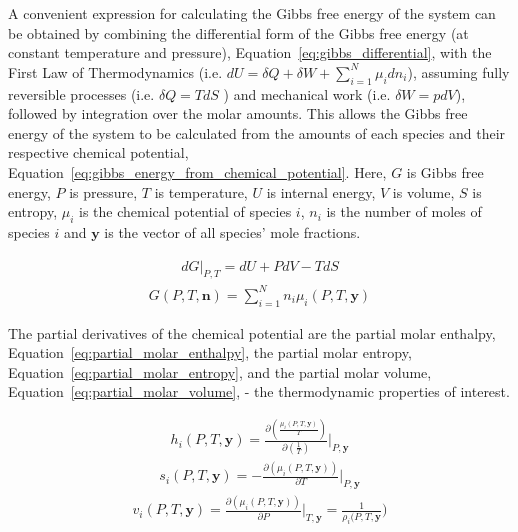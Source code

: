     A convenient expression for calculating the Gibbs free energy of the system can be obtained by combining the differential form of the Gibbs free energy (at constant temperature and pressure), Equation~\ref{eq:gibbs_differential}, with the First Law of Thermodynamics (i.e. \(dU= \delta Q + \delta W + \sum _{i=1}^N \mu_i dn_i\)), assuming fully reversible processes (i.e. \(\delta Q = TdS\) ) and mechanical work (i.e. \(\delta W = pdV\)), followed by integration over the molar amounts. This allows the Gibbs free energy of the system to be calculated from the amounts of each species and their respective chemical potential, Equation~\ref{eq:gibbs_energy_from_chemical_potential}. Here, \(G\) is Gibbs free energy, \(P\) is pressure, \(T\) is temperature, \(U\) is internal energy, \(V\) is volume, \(S\) is entropy, \(\mu_i\) is the chemical potential of species \(i\), \(n_i\) is the number of moles of species \(i\) and \(\mathbf{y}\) is the vector of all species’ mole fractions.

    \begin{align}
        dG \big|_{P,T} = dU + PdV - TdS \label{eq:gibbs_differential}
    \end{align}
    \begin{align}
        G(P, T, \mathbf{n}) = \sum _{i=1}^N n_i \mu_i(P, T, \mathbf{y}) \label{eq:gibbs_energy_from_chemical_potential}
    \end{align}

    The partial derivatives of the chemical potential are the partial molar enthalpy, Equation~\ref{eq:partial_molar_enthalpy}, the partial molar entropy, Equation~\ref{eq:partial_molar_entropy}, and the partial molar volume, Equation~\ref{eq:partial_molar_volume}, - the thermodynamic properties of interest.

    \begin{align}
        h_i (P, T, \mathbf{y}) = \frac{ \partial\left( \frac{\mu_i (P, T, \mathbf{y})}{T} \right)}{\partial\left( \frac{1}{T} \right) } \Bigg|_{P, \mathbf{y}} \label{eq:partial_molar_enthalpy}
    \end{align}
    \begin{align}
        s_i (P, T, \mathbf{y}) = - \frac{ \partial\left( \mu_i (P, T, \mathbf{y})\right)}{\partial T} \Bigg|_{P, \mathbf{y}} \label{eq:partial_molar_entropy}
    \end{align}
    \begin{align}
        v_i (P, T, \mathbf{y}) = \frac{ \partial\left( \mu_i (P, T, \mathbf{y})\right)}{\partial P} \Bigg|_{T, \mathbf{y}} = \frac{1}{\rho_i (P, T, \mathbf{y}}) \label{eq:partial_molar_volume}
    \end{align} 

